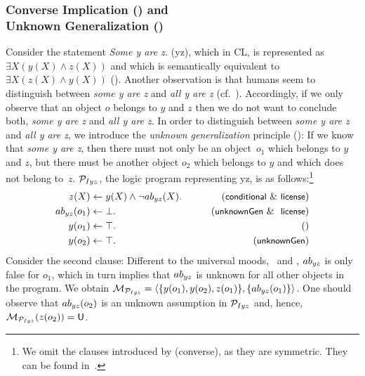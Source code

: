 \documentclass[12pt]{article}
\begin{document}
\subsubsection{Converse Implication (\converse) and \\ Unknown Generalization (\unknownGen)}
Consider the statement \textit{Some y are z.} ({\MI yz}), which in CL, is represented as $\exists X (y(X) \wedge z(X))$
and which is semantically equivalent to $\exists X(z(X) \wedge y(X))$ (\converse).
Another observation is that humans seem to
distinguish between \textit{some y are z} and \textit{all y are z} (cf.~\cite{grice1975,khemlani:2012}).
Accordingly, if we only observe that an object $o$ belongs to $y$ and $z$ then we do not want to conclude both, \textit{some y are z} and \textit{all y are z}.
In order to distinguish between \textit{some y are z} and \textit{all y are z}, we introduce the \textit{unknown generalization} principle (\unknownGen):  If we know that \textit{some y are z}, then there must not only be an object~$o_1$ which belongs to $y$ and $z$, but there must be another object $o_2$ which belongs to
$y$ and which does not belong to~$z$.
${\cal P}_{Iyz}$, the logic program representing \MI yz, is as follows:\footnote{We omit the clauses introduced by ({\footnotesize\textsf{converse}}), as they are symmetric. They can be found in~\cite{declare:2017}.}
\begin{align}
z(X) & \leftarrow y(X) \wedge \neg \Ab_{yz}(X). & \tag{\conditionals\ \&\ \licenses}\\
\Ab_{yz}(o_1) & \leftarrow  \bot. & \tag{\unknownGen\ \& \ \licenses}\\
y(o_1) & \leftarrow  \top. & \tag{} \\
y(o_2) & \leftarrow  \top. & \tag{\unknownGen} 
\end{align}
Consider the second clause: Different to the universal moods, \ME\ and \MA, $ab_{yz}$ is only false for $o_1$, which in turn implies that 
$ab_{yz}$ is unknown for all other objects in the program.
We obtain ${\cal M}_{{\cal P}_{Iyz}}= \langle \{y(o_1), y(o_2), z(o_1)\}, \{ab_{yz}(o_1)\} \rangle$.
One should observe that  $ab_{yz}(o_2)$ is an unknown assumption in
${\cal P}_{Iyz}$ and,
hence, ${\cal M}_{{\cal P}_{Iyz}}(z(o_2)) = \mathsf{U}$.
\end{document}
